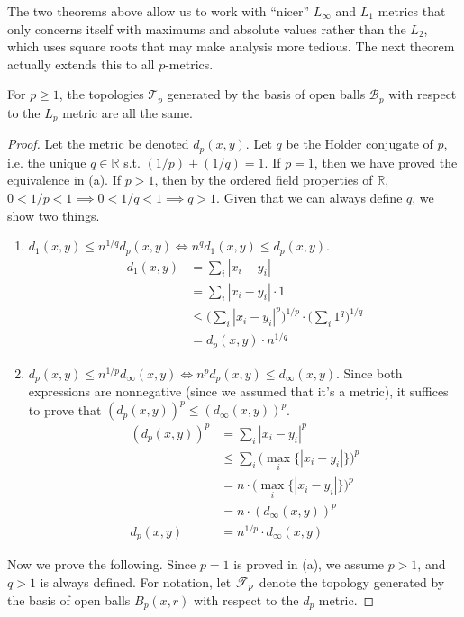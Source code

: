       The two theorems above allow us to work with ``nicer'' $L_\infty$ and $L_1$ metrics that only concerns itself with maximums and absolute values rather than the $L_2$, which uses square roots that may make analysis more tedious. The next theorem actually extends this to all $p$-metrics. 

      \begin{theorem}
        For $p \geq 1$, the topologies $\mathscr{T}_p$ generated by the basis of open balls $\mathscr{B}_p$ with respect to the $L_p$ metric are all the same. 
      \end{theorem}
      \begin{proof}
        Let the metric be denoted $d_p (x, y)$. Let $q$ be the Holder conjugate of $p$, i.e. the unique $q \in \mathbb{R}$ s.t. $(1/p) + (1/q) = 1$. If $p = 1$, then we have proved the equivalence in (a). If $p > 1$, then by the ordered field properties of $\mathbb{R}$, $0 < 1/p < 1 \implies 0 < 1/q < 1 \implies q > 1$. Given that we can always define $q$, we show two things. 
        \begin{enumerate}
          \item $d_1 (x, y) \leq n^{1/q} d_p (x, y) \iff n^q d_1 (x, y) \leq d_p (x, y)$. 
          \begin{align}
            d_1 (x, y) & = \sum_i |x_i - y_i| \\ 
                       & = \sum_i |x_i - y_i| \cdot 1 \\
                       & \leq \bigg( \sum_i |x_i - y_i|^p \bigg)^{1/p} \cdot \bigg(\sum_i 1^q \bigg)^{1/q} \\
                       & = d_p (x, y) \cdot n^{1/q}
          \end{align} 

          \item $d_p (x, y) \leq n^{1/p} d_\infty (x, y) \iff n^p d_p (x, y) \leq d_\infty (x, y)$. Since both expressions are nonnegative (since we assumed that it's a metric), it suffices to prove that $(d_p (x, y))^p \leq (d_\infty (x, y))^{p}$. 
          \begin{align}
            (d_p(x, y))^p & = \sum_i |x_i - y_i|^p \\
                          & \leq \sum_i \big( \max_i \{ |x_i - y_i| \} \big)^p \\
                          & = n \cdot \big( \max_i \{ |x_i - y_i| \} \big)^p \\ 
                          & = n \cdot (d_\infty (x, y))^p \\
            d_p(x, y)     & = n^{1/p} \cdot d_\infty (x, y)
          \end{align}
        \end{enumerate} 
        Now we prove the following. Since $p = 1$ is proved in (a), we assume $p > 1$, and $q > 1$ is always defined. For notation, let $\operatorname{\mathscr{T}}_p$ denote the topology generated by the basis of open balls $B_p (x, r)$ with respect to the $d_p$ metric. 


\end{proof}

